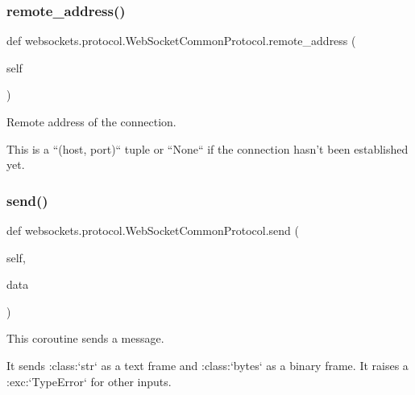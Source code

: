 \subsubsection{\texorpdfstring{remote\+\_\+address()}{remote\_address()}}
{\footnotesize\ttfamily def websockets.\+protocol.\+Web\+Socket\+Common\+Protocol.\+remote\+\_\+address (\begin{DoxyParamCaption}\item[{}]{self }\end{DoxyParamCaption})}

\begin{DoxyVerb}Remote address of the connection.

This is a ``(host, port)`` tuple or ``None`` if the connection hasn't
been established yet.\end{DoxyVerb}
 \mbox{\label{classwebsockets_1_1protocol_1_1_web_socket_common_protocol_a18d893d014ed4d263ac98d1bf6034caf}} 
\subsubsection{\texorpdfstring{send()}{send()}}
{\footnotesize\ttfamily def websockets.\+protocol.\+Web\+Socket\+Common\+Protocol.\+send (\begin{DoxyParamCaption}\item[{}]{self,  }\item[{}]{data }\end{DoxyParamCaption})}

\begin{DoxyVerb}This coroutine sends a message.

It sends :class:`str` as a text frame and :class:`bytes` as a binary
frame. It raises a :exc:`TypeError` for other inputs.\end{DoxyVerb}
 \mbox{\label{classwebsockets_1_1protocol_1_1_web_socket_common_protocol_a07a6c3c50dd1f87096a3f191780d9c2c}} 
